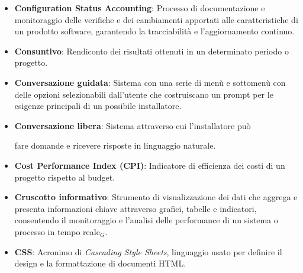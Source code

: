 \begin{itemize}
    \item \textbf{Configuration Status Accounting}: Processo di documentazione e monitoraggio delle verifiche e dei cambiamenti apportati alle caratteristiche di un prodotto software, garantendo la tracciabilità e l'aggiornamento continuo.
    \item \textbf{Consuntivo}: Rendiconto dei risultati ottenuti in un determinato periodo o progetto.
    \item \textbf{Conversazione guidata}: Sistema con una serie di menù e sottomenù con delle opzioni
    selezionabili dall’utente che costruiscano un prompt per le esigenze principali di un
    possibile installatore.
    \item \textbf{Conversazione libera}: Sistema attraverso cui l’installatore può

    fare domande e ricevere risposte in linguaggio naturale.
    \item \textbf{Cost Performance Index (CPI)}: Indicatore di efficienza dei costi di un progetto rispetto al budget.
    \item \textbf{Cruscotto informativo}: Strumento di visualizzazione dei dati che aggrega e presenta informazioni chiave attraverso grafici, tabelle e indicatori, consentendo il monitoraggio e l'analisi delle performance di un sistema o processo in tempo reale$_G$.
    \item \textbf{CSS}: Acronimo di \textit{Cascading Style Sheets}, linguaggio usato per definire il design e la formattazione di documenti HTML.

\end{itemize}
